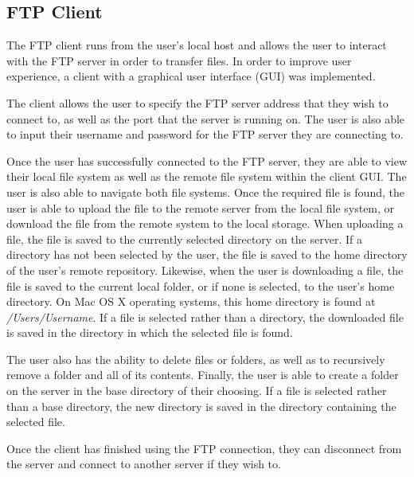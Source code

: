 \documentclass[10pt,twocolumn]{witseiepaper}
\begin{document}
\subsection{FTP Client}
The FTP client runs from the user's local host and allows the user to interact with the FTP server in order to transfer files. In order to improve user experience, a client with a graphical user interface (GUI) was implemented. 

The client allows the user to specify the FTP server address that they wish to connect to, as well as the port that the server is running on. The user is also able to input their username and password for the FTP server they are connecting to.

Once the user has successfully connected to the FTP server, they are able to view their local file system as well as the remote file system within the client GUI. The user is also able to navigate both file systems. Once the required file is found, the user is able to upload the file to the remote server from the local file system, or download the file from the remote system to the local storage. When uploading a file, the file is saved to the currently selected directory on the server. If a directory has not been selected by the user, the file is saved to the home directory of the user's remote repository. Likewise, when the user is downloading a file, the file is saved to the current local folder, or if none is selected, to the user's home directory. On Mac OS X operating systems, this home directory is found at \textit{/Users/Username}. If a file is selected rather than a directory, the downloaded file is saved in the directory in which the selected file is found.

The user also has the ability to delete files or folders, as well as to recursively remove a folder and all of its contents. Finally, the user is able to create a folder on the server in the base directory of their choosing. If a file is selected rather than a base directory, the new directory is saved in the directory containing the selected file.

Once the client has finished using the FTP connection, they can disconnect from the server and connect to another server if they wish to.
\end{document}
